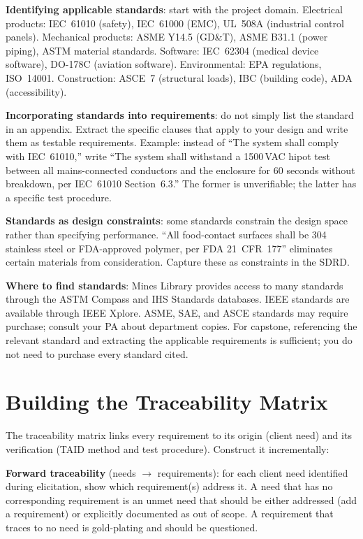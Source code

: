 \textbf{Identifying applicable standards}: start with the project domain. Electrical products: IEC~61010 (safety), IEC~61000 (EMC), UL~508A (industrial control panels). Mechanical products: ASME Y14.5 (GD\&T), ASME B31.1 (power piping), ASTM material standards. Software: IEC~62304 (medical device software), DO-178C (aviation software). Environmental: EPA regulations, ISO~14001. Construction: ASCE~7 (structural loads), IBC (building code), ADA (accessibility).

\textbf{Incorporating standards into requirements}: do not simply list the standard in an appendix. Extract the specific clauses that apply to your design and write them as testable requirements. Example: instead of ``The system shall comply with IEC~61010,'' write ``The system shall withstand a 1500\,VAC hipot test between all mains-connected conductors and the enclosure for 60 seconds without breakdown, per IEC~61010 Section~6.3.'' The former is unverifiable; the latter has a specific test procedure.

\textbf{Standards as design constraints}: some standards constrain the design space rather than specifying performance. ``All food-contact surfaces shall be 304 stainless steel or FDA-approved polymer, per FDA 21~CFR~177'' eliminates certain materials from consideration. Capture these as constraints in the SDRD.

\textbf{Where to find standards}: Mines Library provides access to many standards through the ASTM Compass and IHS Standards databases. IEEE standards are available through IEEE Xplore. ASME, SAE, and ASCE standards may require purchase; consult your PA about department copies. For capstone, referencing the relevant standard and extracting the applicable requirements is sufficient; you do not need to purchase every standard cited.



\section{Building the Traceability Matrix}
The traceability matrix links every requirement to its origin (client need) and its verification (TAID method and test procedure). Construct it incrementally:

\textbf{Forward traceability} (needs $\to$ requirements): for each client need identified during elicitation, show which requirement(s) address it. A need that has no corresponding requirement is an unmet need that should be either addressed (add a requirement) or explicitly documented as out of scope. A requirement that traces to no need is gold-plating and should be questioned.

